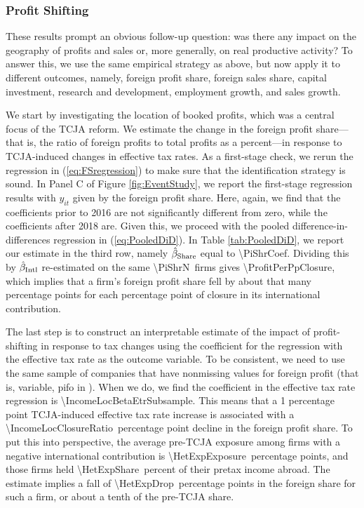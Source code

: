 \documentclass[11pt,letterpaper]{article}
\newcommand{\CountNum}[1]{\num[round-mode=places,round-precision=0]{#1}}
\newcommand{\ShareNum}[1]{\num[round-mode=places,round-precision=1]{#1}}
\newcommand{\CoefNum}[1]{\num[round-mode=places,round-precision=3]{#1}}
\newcommand{\RatioNum}[1]{\num[round-mode=places,round-precision=2]{#1}}
\begin{document}
\begin{table}[!tp]
\bigskip
\bigskip
\end{table}





\subsubsection{Profit Shifting\label{sec:ProfitShifting}} 

These results prompt an obvious follow-up question:  was there any impact on the geography of 
profits and sales or, more generally, on real productive activity?
To answer this, we use the same empirical strategy as above, but now
apply it to different outcomes, namely, foreign profit share,
foreign sales share, capital investment, research and development,
employment growth, and  sales growth.


We start by investigating the location of booked profits, which was a central focus of the
TCJA reform.  We estimate the change in the foreign profit
share---that is, the ratio of foreign profits to total profits as a percent---in response
to TCJA-induced changes in effective tax rates.  As a first-stage check, we rerun
the regression in (\ref{eq:FSregression}) to make sure that the identification 
strategy is sound.  In Panel C of Figure \ref{fig:EventStudy},
we report the first-stage regression results with $y_{it}$ given
by the foreign profit share.  Here, again, we find that the 
coefficients prior to 2016 are not significantly different from zero,
while the coefficients after 2018 are. Given this, we proceed with the pooled
difference-in-differences regression in (\ref{eq:PooledDiD}).
In Table \ref{tab:PooledDiD}, we report our estimate in the third
row, namely $\hat\beta_{\rm Share}$ equal to \CoefNum{\PiShrCoef}.
Dividing this by $\hat\beta_{\rm Intl}$ re-estimated on the same
\CountNum{\PiShrN}\ firms gives \CoefNum{\ProfitPerPpClosure}, which implies that
a firm's foreign profit share fell by about that many percentage points
for each percentage point of closure in its international
contribution.

The last step is to construct an interpretable estimate
of the impact of profit-shifting in response to tax changes using the coefficient
for the regression with the effective tax rate as the outcome variable.
To be consistent, we need to use the same sample of companies that have nonmissing
values for foreign profit (that is, variable, pifo in \citet{CompustatAnnual}).
When we do, we find the coefficient in the effective tax rate regression is 
\CoefNum{\IncomeLocBetaEtrSubsample}.
This means that a 1 percentage point TCJA-induced effective tax rate increase is 
associated with a 
\RatioNum{\IncomeLocClosureRatio}\ percentage point decline in the foreign profit share. 
To put this into perspective, the average pre-TCJA exposure among firms with
a negative international contribution is
\ShareNum{\HetExpExposure}\ percentage points, and those firms held
\ShareNum{\HetExpShare}\ percent of their pretax income abroad. The
estimate implies a fall of \ShareNum{\HetExpDrop}\ percentage points in the foreign share
for such a firm, or about a tenth of the pre-TCJA share.
\end{document}
